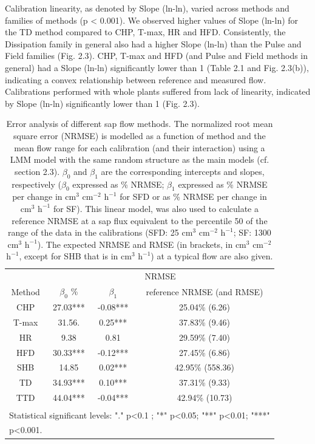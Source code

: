 \documentclass[11pt,twoside]{reedthesis}
\begin{document}
Calibration linearity, as denoted by Slope (ln-ln), varied across
methods and families of methods (p \textless{} 0.001). We observed
higher values of Slope (ln-ln) for the TD method compared to CHP, T-max,
HR and HFD. Consistently, the Dissipation family in general also had a
higher Slope (ln-ln) than the Pulse and Field families (Fig. 2.3). CHP,
T-max and HFD (and Pulse and Field methods in general) had a Slope
(ln-ln) significantly lower than 1 (Table 2.1 and Fig. 2.3(b)),
indicating a convex relationship between reference and measured flow.
Calibrations performed with whole plants suffered from lack of
linearity, indicated by Slope (ln-ln) significantly lower than 1 (Fig.
2.3).\par
\begin{table}

\caption[Error analysis of different sap flow methods.]{\label{tab:Ch2T2}Error analysis of different sap flow methods. The normalized root mean square error (NRMSE) is modelled as a function of method and the mean flow range for each calibration (and their interaction) using a LMM model with the same random structure as the main models (cf. section 2.3). $\beta_0$ and $\beta_1$ are the corresponding intercepts and slopes, respectively ($\beta_0$ expressed as \% NRMSE; $\beta_1$ expressed as \% NRMSE per change in $\text{cm}^3$ $\text{cm}^{-2}$ $\text{h}^{-1}$ for SFD or as \% NRMSE per change in $\text{cm}^3$ $\text{h}^{-1}$ for SF). This linear model, was also used to calculate a reference NRMSE at a sap flux equivalent to the percentile 50 of the range of the data in the calibrations (SFD: 25 $\text{cm}^3$ $\text{cm}^{-2}$ $\text{h}^{-1}$; SF: 1300 $\text{cm}^3$ $\text{h}^{-1}$). The expected NRMSE and RMSE (in brackets, in $\text{cm}^3$ $\text{cm}^{-2}$ $\text{h}^{-1}$, except for SHB that is in $\text{cm}^3$ $\text{h}^{-1}$) at a typical flow are also given.}
\centering
\fontsize{10}{12}\selectfont
\begin{tabular}[t]{cccc}
\toprule
\multicolumn{1}{c}{ } & \multicolumn{3}{c}{NRMSE} \\
\cmidrule(l{3pt}r{3pt}){2-4}
Method & $\beta_0$\; \% & $\beta_1$ & reference NRMSE (and RMSE)\\
\midrule
CHP & 27.03*** & -0.08*** & 25.04\% (6.26)\\
T-max & 31.56. & 0.25*** & 37.83\% (9.46)\\
HR & 9.38 & 0.81 & 29.59\% (7.40)\\
HFD & 30.33*** & -0.12*** & 27.45\% (6.86)\\
SHB & 14.85 & 0.02*** & 42.95\% (558.36)\\
TD & 34.93*** & 0.10*** & 37.31\% (9.33)\\
TTD & 44.04*** & -0.04*** & 42.94\% (10.73)\\
\bottomrule
\multicolumn{4}{l}{\textsuperscript{} Statistical significant levels: "." p<0.1 ; "*" p<0.05; "**" p<0.01; "***"}\\
\multicolumn{4}{l}{p<0.001.}\\
\end{tabular}
\end{table}
\end{document}
